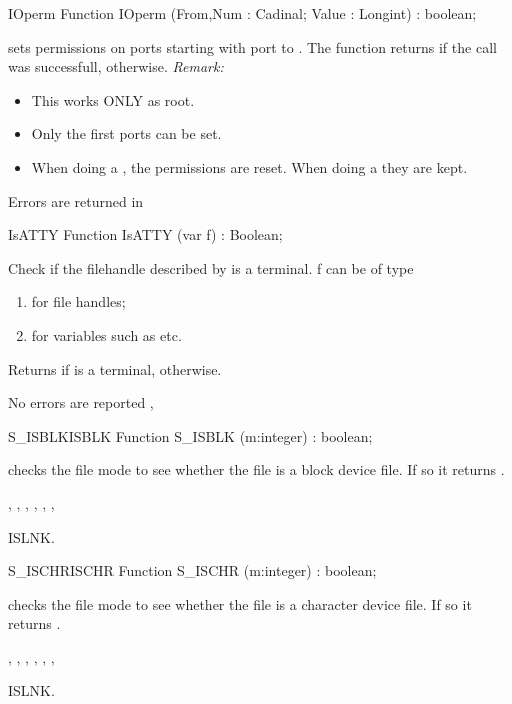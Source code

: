 \html{}
\begin{function}{IOperm}
\Declaration
Function IOperm (From,Num : Cadinal; Value : Longint) : boolean;

\Description
{}
  sets permissions on  ports starting with port  to 
  . The function returns  if the call was successfull,
   otherwise.
{\em Remark:}
\begin{itemize}
\item This works ONLY as root.
\item Only the first  ports can be set.
\item When doing a , the permissions are reset. When doing a
 they are kept.
\end{itemize}

\Errors
Errors are returned in 
\SeeAlso
{}
\end{function}
\begin{function}{IsATTY}
\Declaration
Function IsATTY (var f) : Boolean;

\Description

Check if the filehandle described by  is a terminal.
f can be of type
\begin{enumerate}
\item {} for file handles;
\item {} for  variables such as  etc.
\end{enumerate}
Returns  if  is a terminal,  otherwise.

\Errors
No errors are reported
\SeeAlso
{},
\end{function}
\begin{functionl}{S\_ISBLK}{ISBLK}
\Declaration
Function S\_ISBLK (m:integer) : boolean;

\Description
  checks the file mode  to see whether the file is a
block device file. If so it returns .

\Errors
{},
 , 
 ,
 ,
 ,
 ,

\SeeAlso
ISLNK.
\end{functionl}
\begin{functionl}{S\_ISCHR}{ISCHR}
\Declaration
Function S\_ISCHR (m:integer) : boolean;

\Description
  checks the file mode  to see whether the file is a
character device file. If so it returns .

\Errors
{},
 , 
 ,
 ,
 ,
 ,

\SeeAlso
ISLNK.
\end{functionl}
